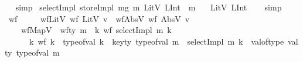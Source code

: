 \begin{isabellebody}
\ %
\endisadelimproof
%
\isatagproof
{}\isamarkupfalse%
\ simp%
\endisatagproof
{\isafoldproof}%
%
\isadelimproof
%
\endisadelimproof
\isanewline
{}\isamarkupfalse%
\ {\isachardoublequoteopen}selectImpl\ {\isacharparenleft}{\kern0pt}storeImpl\ mg{}\ m{}{}\ {\isacharparenleft}{\kern0pt}LitV\ {\isacharparenleft}{\kern0pt}LInt\ {}{}{\isacharparenright}{\kern0pt}{\isacharparenright}{\kern0pt}{\isacharparenright}{\kern0pt}\ m{}{}\isanewline
\ \ {\isacharequal}{\kern0pt}\ {\isacharparenleft}{\kern0pt}LitV\ {\isacharparenleft}{\kern0pt}LInt\ {}{}{\isacharparenright}{\kern0pt}{\isacharparenright}{\kern0pt}{\isachardoublequoteclose}%
\isadelimproof
\ %
\endisadelimproof
%
\isatagproof
{}\isamarkupfalse%
\ simp%
\endisatagproof
{\isafoldproof}%
%
\isadelimproof
%
\endisadelimproof
%
\isadelimdocument
%
\endisadelimdocument
%
\isatagdocument
%
\isamarkuptrue%
%
\endisatagdocument
{\isafolddocument}%
%
\isadelimdocument
%
\endisadelimdocument
{}\isamarkupfalse%
\ wf\ \isanewline
\ \ \ \ wfLitV{\isacharcolon}{\kern0pt}\ {\isachardoublequoteopen}wf\ {\isacharparenleft}{\kern0pt}LitV\ v{\isacharparenright}{\kern0pt}{\isachardoublequoteclose}\ {\isacharbar}{\kern0pt}\ wfAbsV{\isacharcolon}{\kern0pt}\ {\isachardoublequoteopen}wf\ {\isacharparenleft}{\kern0pt}AbsV\ v{\isacharparenright}{\kern0pt}{\isachardoublequoteclose}\ {\isacharbar}{\kern0pt}\isanewline
\ \ \ \ wfMapV{\isacharcolon}{\kern0pt}\ {\isachardoublequoteopen}{\isasymlbrakk}\ wf{\isacharunderscore}{\kern0pt}ty\ m{\isacharsemicolon}{\kern0pt}\ \ {\isacharparenleft}{\kern0pt}{\isasymforall}k{\isachardot}{\kern0pt}\ wf\ {\isacharparenleft}{\kern0pt}selectImpl\ m\ k{\isacharparenright}{\kern0pt}{\isacharparenright}{\kern0pt}{\isacharsemicolon}{\kern0pt}\isanewline
\ \ \ \ \ \ {\isacharparenleft}{\kern0pt}{\isasymforall}k{\isachardot}{\kern0pt}\ {\isacharparenleft}{\kern0pt}{\isasymnot}wf\ k\ {\isasymor}\ type{\isacharunderscore}{\kern0pt}of{\isacharunderscore}{\kern0pt}val\ k\ {\isasymnoteq}\ key{\isacharunderscore}{\kern0pt}ty\ {\isacharparenleft}{\kern0pt}type{\isacharunderscore}{\kern0pt}of{\isacharunderscore}{\kern0pt}val\ m{\isacharparenright}{\kern0pt}{\isacharparenright}{\kern0pt}\ {\isasymlongrightarrow}\ {\isacharparenleft}{\kern0pt}selectImpl\ m\ k{\isacharparenright}{\kern0pt}\ {\isacharequal}{\kern0pt}\ val{\isacharunderscore}{\kern0pt}of{\isacharunderscore}{\kern0pt}type\ {\isacharparenleft}{\kern0pt}val{\isacharunderscore}{\kern0pt}ty\ {\isacharparenleft}{\kern0pt}type{\isacharunderscore}{\kern0pt}of{\isacharunderscore}{\kern0pt}val\ m{\isacharparenright}{\kern0pt}{\isacharparenright}{\kern0pt}{\isacharparenright}{\kern0pt}{\isacharsemicolon}{\kern0pt}\isanewline

\end{isabellebody}

